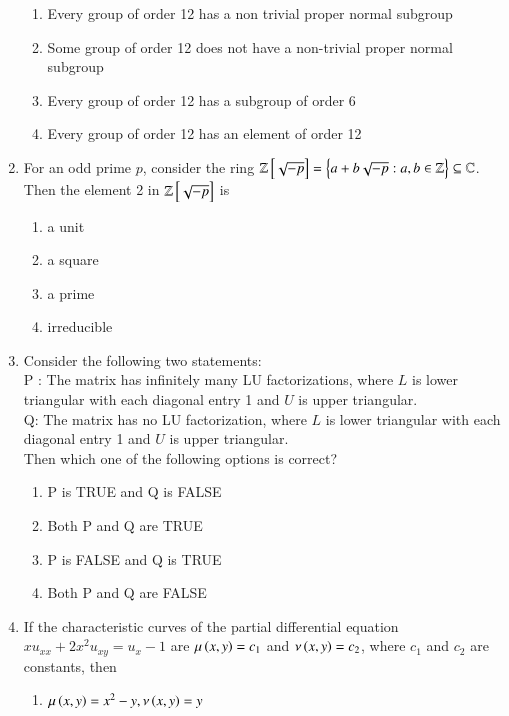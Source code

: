 \documentclass[journal]{IEEEtran}
\begin{document}
\begin{enumerate}
\begin{enumerate}
    \item Every group of order 12 has a non trivial proper normal subgroup 
    \item Some group of order 12 does not have a non-trivial proper normal subgroup
    \item Every group of order 12 has a subgroup of order 6
    \item Every group of order 12 has an element of order 12
\end{enumerate}
\item For an odd prime $p$, consider the ring $\mathbb{Z}{}\left[\sqrt{-p}\right]=\left\{a+b\sqrt{-p}: a,b\in \mathbb{Z}\right\}\subseteq \mathbb{C}$. Then the element 2 in $\mathbb{Z}{}\left[\sqrt{-p}\right]$ is 
\begin{multicols}{4}
\begin{enumerate}
    \item a unit 
    \item a square
    \item a prime 
    \item irreducible
\end{enumerate}
\end{multicols}
\item Consider the following two statements:\\
  P : The matrix  has infinitely many LU factorizations, where $L$ is lower triangular with each diagonal entry 1 and $U$ is upper triangular.\\
  Q: The matrix  has no LU factorization, where $L$ is lower triangular with each diagonal entry 1 and $U$ is upper triangular.\\
  Then which one of the following options is correct?
  \begin{enumerate}
      \item P is TRUE and Q is FALSE
      \item Both P and Q are TRUE
      \item P is FALSE and Q is TRUE
      \item Both P and Q are FALSE
  \end{enumerate}
\item If the characteristic curves of the partial differential equation $xu_{xx}+2x^2u_{xy}=u_x-1$ are $\mu\left(x,y\right)=c_1$ and $\nu\left(x,y\right)=c_2$, where $c_1$ and $c_2$ are constants, then
\begin{enumerate}
    \item $\mu\left(x,y\right)=x^2-y,\nu\left(x,y\right)=y$

\end{enumerate}
\end{enumerate}
\end{document}

